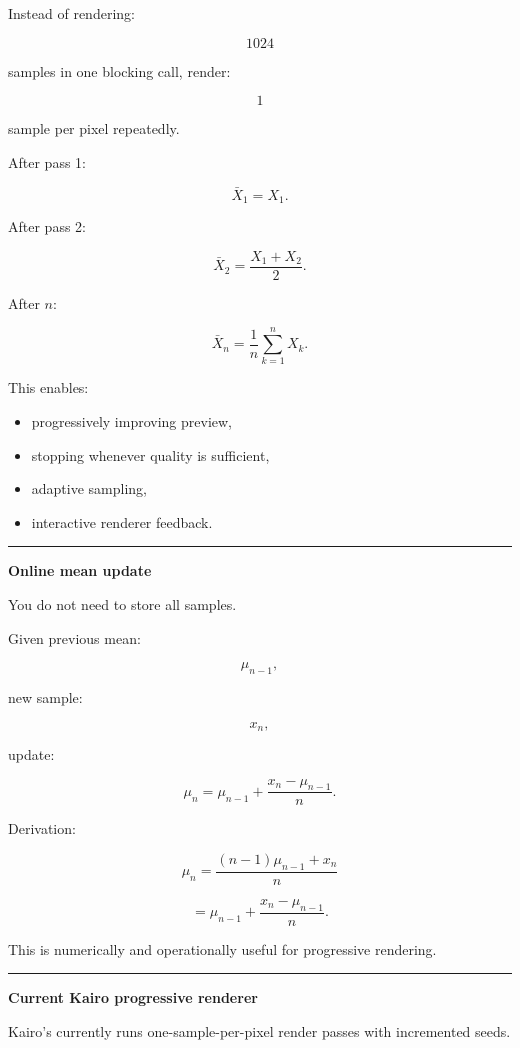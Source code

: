 Instead of rendering:

\[
1024
\]

samples in one blocking call, render:

\[
1
\]

sample per pixel repeatedly.

After pass 1:

\[
\bar X_1=X_1.
\]

After pass 2:

\[
\bar X_2=\frac{X_1+X_2}{2}.
\]

After \(n\):

\[
\boxed{
\bar X_n
=
\frac1n
\sum_{k=1}^nX_k.
}
\]

This enables:

\begin{itemize}
\tightlist
\item
  progressively improving preview,
\item
  stopping whenever quality is sufficient,
\item
  adaptive sampling,
\item
  interactive renderer feedback.
\end{itemize}

\begin{center}\rule{0.5\linewidth}{0.5pt}\end{center}

\textbf{Online mean update}

You do not need to store all samples.

Given previous mean:

\[
\mu_{n-1},
\]

new sample:

\[
x_n,
\]

update:

\[
\boxed{
\mu_n
=
\mu_{n-1}
+
\frac{
x_n-\mu_{n-1}
}{
n
}.
}
\]

Derivation:

\[
\mu_n
=
\frac{
(n-1)\mu_{n-1}+x_n
}{
n
}
\]

\[
=
\mu_{n-1}
+
\frac{x_n-\mu_{n-1}}{n}.
\]

This is numerically and operationally useful for progressive rendering.

\begin{center}\rule{0.5\linewidth}{0.5pt}\end{center}

\textbf{Current Kairo progressive renderer}

Kairo's  currently runs one-sample-per-pixel render passes with incremented seeds.

